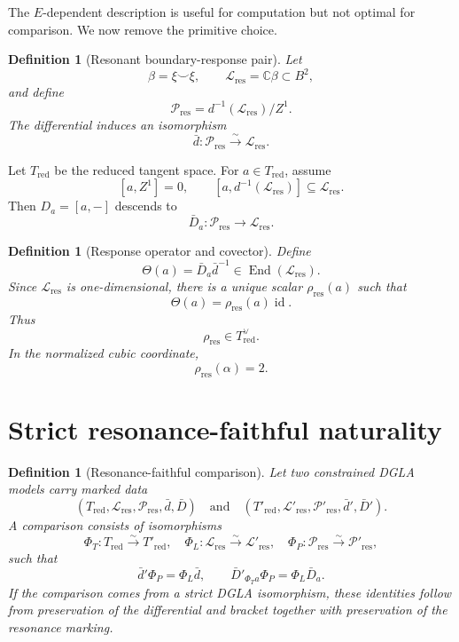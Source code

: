 \documentclass[11pt]{amsart}
\newtheorem{definition}[theorem]{Definition}
\newcommand{\C}{\mathbb C}
\newcommand{\End}{\operatorname{End}}
\newcommand{\id}{\operatorname{id}}
\begin{document}
The \(E\)-dependent description is useful for computation but not optimal for comparison.  We now remove the primitive choice.

\begin{definition}[Resonant boundary-response pair]
Let
\[
\beta=\xi\smile\xi,
\qquad
\mathcal L_{\mathrm{res}}=\C\beta\subset B^2,
\]
and define
\[
\mathcal P_{\mathrm{res}}
=d^{-1}(\mathcal L_{\mathrm{res}})/Z^1.
\]
The differential induces an isomorphism
\[
\bar d:\mathcal P_{\mathrm{res}}\xrightarrow{\sim}\mathcal L_{\mathrm{res}}.
\]
\end{definition}

Let \(T_{\mathrm{red}}\) be the reduced tangent space.  For \(a\in T_{\mathrm{red}}\), assume
\[
[a,Z^1]=0,
\qquad
[a,d^{-1}(\mathcal L_{\mathrm{res}})]
\subseteq\mathcal L_{\mathrm{res}}.
\]
Then \(D_a=[a,-]\) descends to
\[
\bar D_a:\mathcal P_{\mathrm{res}}\longrightarrow\mathcal L_{\mathrm{res}}.
\]

\begin{definition}[Response operator and covector]
Define
\[
\Theta(a)=\bar D_a\bar d^{-1}
\in\End(\mathcal L_{\mathrm{res}}).
\]
Since \(\mathcal L_{\mathrm{res}}\) is one-dimensional, there is a unique scalar \(\rho_{\mathrm{res}}(a)\) such that
\[
\Theta(a)=\rho_{\mathrm{res}}(a)\id.
\]
Thus
\[
\rho_{\mathrm{res}}\in T_{\mathrm{red}}^\vee.
\]
In the normalized cubic coordinate,
\[
\rho_{\mathrm{res}}(\alpha)=2.
\]
\end{definition}

\section{Strict resonance-faithful naturality}

\begin{definition}[Resonance-faithful comparison]
Let two constrained DGLA models carry marked data
\[
(T_{\mathrm{red}},\mathcal L_{\mathrm{res}},\mathcal P_{\mathrm{res}},\bar d,\bar D)
\quad\text{and}\quad
(T'_{\mathrm{red}},\mathcal L'_{\mathrm{res}},\mathcal P'_{\mathrm{res}},\bar d',\bar D').
\]
A comparison consists of isomorphisms
\[
\Phi_T:T_{\mathrm{red}}\xrightarrow{\sim}T'_{\mathrm{red}},
\quad
\Phi_L:\mathcal L_{\mathrm{res}}\xrightarrow{\sim}\mathcal L'_{\mathrm{res}},
\quad
\Phi_P:\mathcal P_{\mathrm{res}}\xrightarrow{\sim}\mathcal P'_{\mathrm{res}},
\]
such that
\[
\bar d'\Phi_P=\Phi_L\bar d,
\qquad
\bar D'_{\Phi_Ta}\Phi_P=\Phi_L\bar D_a.
\]
If the comparison comes from a strict DGLA isomorphism, these identities follow from preservation of the differential and bracket together with preservation of the resonance marking.
\end{definition}
\end{document}
